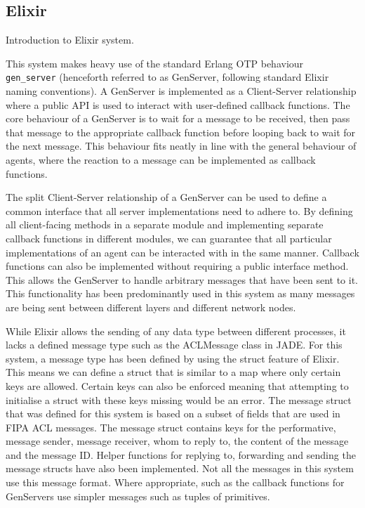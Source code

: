 \subsection{Elixir}

Introduction to Elixir system.

This system makes heavy use of the standard Erlang OTP behaviour\\ \verb|gen_server| (henceforth referred to as GenServer, following standard Elixir naming conventions).
A GenServer is implemented as a Client-Server relationship where a public API is used to interact with user-defined callback functions.
The core behaviour of a GenServer is to wait for a message to be received, then pass that message to the appropriate callback function before looping back to wait for the next message.
This behaviour fits neatly in line with the general behaviour of agents, where the reaction to a message can be implemented as callback functions.

The split Client-Server relationship of a GenServer can be used to define a common interface that all server implementations need to adhere to.
By defining all client-facing methods in a separate module and implementing separate callback functions in different modules, we can guarantee that all particular implementations of an agent can be interacted with in the same manner.
Callback functions can also be implemented without requiring a public interface method.
This allows the GenServer to handle arbitrary messages that have been sent to it.
This functionality has been predominantly used in this system as many messages are being sent between different layers and different network nodes.

While Elixir allows the sending of any data type between different processes, it lacks a defined message type such as the ACLMessage class in JADE\@.
For this system, a message type has been defined by using the struct feature of Elixir.
This means we can define a struct that is similar to a map where only certain keys are allowed.
Certain keys can also be enforced meaning that attempting to initialise a struct with these keys missing would be an error.
The message struct that was defined for this system is based on a subset of fields that are used in FIPA ACL messages.
The message struct contains keys for the performative, message sender, message receiver, whom to reply to, the content of the message and the message ID\@.
Helper functions for replying to, forwarding and sending the message structs have also been implemented.
Not all the messages in this system use this message format.
Where appropriate, such as the callback functions for GenServers use simpler messages such as tuples of primitives.

